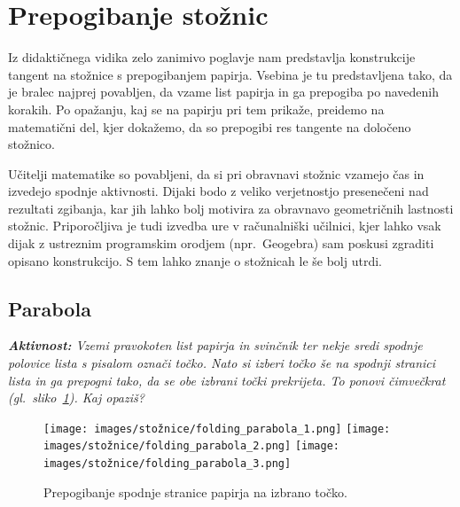 \section{Prepogibanje stožnic}
\label{pogl:stoznice}


Iz didaktičnega vidika zelo zanimivo poglavje nam predstavlja konstrukcije tangent na stožnice s prepogibanjem papirja. Vsebina je tu predstavljena tako, da je bralec najprej povabljen, da vzame list papirja in ga prepogiba po navedenih korakih. Po opažanju, kaj se na papirju pri tem prikaže, preidemo na matematični del, kjer dokažemo, da so prepogibi res tangente na določeno stožnico.

Učitelji matematike so povabljeni, da si pri obravnavi stožnic vzamejo čas in izvedejo spodnje aktivnosti. Dijaki bodo z veliko verjetnostjo presenečeni nad rezultati zgibanja, kar jih lahko bolj motivira za obravnavo geometričnih lastnosti stožnic. Priporočljiva je tudi izvedba ure v računalniški učilnici, kjer lahko vsak dijak z ustreznim programskim orodjem (npr.\ Geogebra) sam poskusi zgraditi opisano konstrukcijo. S tem lahko znanje o stožnicah le še bolj utrdi.

\subsection{Parabola}

\textit{\textbf{Aktivnost:} Vzemi pravokoten list papirja in svinčnik ter nekje sredi spodnje polovice lista s pisalom označi točko. Nato si izberi točko še na spodnji stranici lista in ga prepogni tako, da se obe izbrani točki prekrijeta. To ponovi čimvečkrat (gl.\ sliko~\ref{fig:koraki_parabola}). Kaj opaziš?}

\begin{figure}[h]
    \centering
    \texttt{[image: images/stožnice/folding\_parabola\_1.png]}
    \texttt{[image: images/stožnice/folding\_parabola\_2.png]}
    \texttt{[image: images/stožnice/folding\_parabola\_3.png]}
    \caption[Prepogibanje parabole]{Prepogibanje spodnje stranice papirja na izbrano točko.}
    \label{fig:koraki_parabola}
\end{figure}


